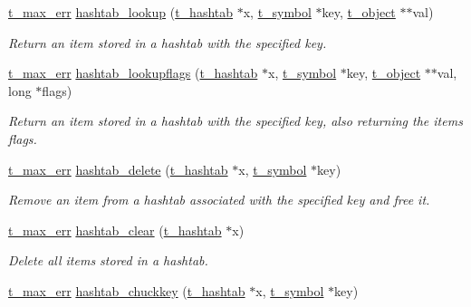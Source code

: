 \begin{DoxyCompactItemize}
\hyperlink{group__datatypes_ga73edaae82b318855cc09fac994918165}{t\_\-max\_\-err} \hyperlink{group__hashtab_gadb206ea811204926bdbf1aa00ca679dc}{hashtab\_\-lookup} (\hyperlink{structt__hashtab}{t\_\-hashtab} $\ast$x, \hyperlink{structt__symbol}{t\_\-symbol} $\ast$key, \hyperlink{structt__object}{t\_\-object} $\ast$$\ast$val)
\begin{DoxyCompactList}\small\item\em Return an item stored in a hashtab with the specified key. \item\end{DoxyCompactList}\item 
\hyperlink{group__datatypes_ga73edaae82b318855cc09fac994918165}{t\_\-max\_\-err} \hyperlink{group__hashtab_ga0947b6e2b1e6ed6b55b7f891536429b9}{hashtab\_\-lookupflags} (\hyperlink{structt__hashtab}{t\_\-hashtab} $\ast$x, \hyperlink{structt__symbol}{t\_\-symbol} $\ast$key, \hyperlink{structt__object}{t\_\-object} $\ast$$\ast$val, long $\ast$flags)
\begin{DoxyCompactList}\small\item\em Return an item stored in a hashtab with the specified key, also returning the items flags. \item\end{DoxyCompactList}\item 
\hyperlink{group__datatypes_ga73edaae82b318855cc09fac994918165}{t\_\-max\_\-err} \hyperlink{group__hashtab_gadc3b33bd84f054f9a725b87e809779fc}{hashtab\_\-delete} (\hyperlink{structt__hashtab}{t\_\-hashtab} $\ast$x, \hyperlink{structt__symbol}{t\_\-symbol} $\ast$key)
\begin{DoxyCompactList}\small\item\em Remove an item from a hashtab associated with the specified key and free it. \item\end{DoxyCompactList}\item 
\hyperlink{group__datatypes_ga73edaae82b318855cc09fac994918165}{t\_\-max\_\-err} \hyperlink{group__hashtab_gae7984db2865416d6da6ce20c76975321}{hashtab\_\-clear} (\hyperlink{structt__hashtab}{t\_\-hashtab} $\ast$x)
\begin{DoxyCompactList}\small\item\em Delete all items stored in a hashtab. \item\end{DoxyCompactList}\item 
\hyperlink{group__datatypes_ga73edaae82b318855cc09fac994918165}{t\_\-max\_\-err} \hyperlink{group__hashtab_ga9bbf0199ef8b92a977b3bee5fd746799}{hashtab\_\-chuckkey} (\hyperlink{structt__hashtab}{t\_\-hashtab} $\ast$x, \hyperlink{structt__symbol}{t\_\-symbol} $\ast$key)

\end{DoxyCompactItemize}
